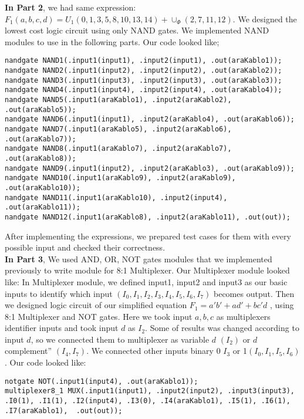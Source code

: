 \documentclass[pdftex,12pt,a4paper]{article}
\begin{document}
\textbf{In Part 2}, we had same expression: 
\(F_1(a, b, c, d) = U_1(0, 1, 3, 5, 8, 10, 13, 14) + \cup_\Phi(2, 7, 11, 12)\). We designed the lowest cost logic circuit using only NAND gates. We implemented NAND modules to use in the following parts. Our code looked like;

\begin{verbatim}
nandgate NAND1(.input1(input1), .input2(input1), .out(araKablo1)); 
nandgate NAND2(.input1(input2), .input2(input2), .out(araKablo2));
nandgate NAND3(.input1(input3), .input2(input3), .out(araKablo3));
nandgate NAND4(.input1(input4), .input2(input4), .out(araKablo4)); 
nandgate NAND5(.input1(araKablo1), .input2(araKablo2), .out(araKablo5));
nandgate NAND6(.input1(input1), .input2(araKablo4), .out(araKablo6)); 
nandgate NAND7(.input1(araKablo5), .input2(araKablo6), .out(araKablo7));
nandgate NAND8(.input1(araKablo7), .input2(araKablo7), .out(araKablo8));
nandgate NAND9(.input1(input2), .input2(araKablo3), .out(araKablo9));
nandgate NAND10(.input1(araKablo9), .input2(araKablo9), .out(araKablo10));
nandgate NAND11(.input1(araKablo10), .input2(input4), .out(araKablo11));
nandgate NAND12(.input1(araKablo8), .input2(araKablo11), .out(out));
\end{verbatim}
After implementing the expressions, we prepared test cases for them with every possible input and checked their correctness.\\

\textbf{In Part 3}, We used AND, OR, NOT gates modules that we implemented previously to write module for 8:1 Multiplexer. Our Multiplexer module looked like:
In Multiplexer module, we defined input1, input2 and input3 as our basic inputs to identify which input \((I_0, I_1, I_2, I_3, I_4, I_5, I_6, I_7)\) becomes output. 
Then we designed logic circuit of our simplified equation \(F_1 = a'b' + ad' + bc'd\)	, using 8:1 Multiplexer and NOT gates. Here we took input \(a, b, c\) as multiplexers identifier inputs and took input \(d\) as \(I_2\). Some of results was changed according to input \(d\), so we connected them to multiplexer as variable \(d\) \((I_2)\) or \(d\) complement” \((I_4, I_7)\). We connected other inputs binary 0 \(I_3\) or 1\((I_0, I_1, I_5, I_6)\). Our code looked like:

\begin{verbatim}
notgate NOT(.input1(input4), .out(araKablo1));
multiplexer8_1 MUX(.input1(input1), .input2(input2), .input3(input3),
.I0(1), .I1(1), .I2(input4), .I3(0), .I4(araKablo1), .I5(1), .I6(1),
.I7(araKablo1),  .out(out));
\end{verbatim}
\end{document}
